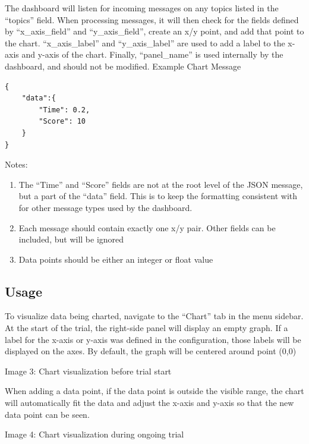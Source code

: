The dashboard will listen for incoming messages on any topics listed in the
``topics” field. When processing messages, it will then check for the fields
defined by ``x\_axis\_field'' and ``y\_axis\_field”, create an x/y point, and
add that point to the chart. ``x\_axis\_label'' and ``y\_axis\_label'' are used to
add a label to the x-axis and y-axis of the chart. Finally, ``panel\_name'' is
used internally by the dashboard, and should not be modified.  Example Chart
Message

\begin{verbatim}
{
    "data":{
        "Time": 0.2,
        "Score": 10
    }
}
\end{verbatim}



Notes:
\begin{enumerate}

    \item The ``Time” and ``Score” fields are not at the root level of the JSON
        message, but a part of the ``data” field. This is to keep the
        formatting consistent with for other message types used by the
        dashboard.

    \item Each message should contain exactly one x/y pair. Other fields can be
        included, but will be ignored

    \item Data points should be either an integer or float value

\end{enumerate}

\subsection{Usage}

To visualize data being charted, navigate to the ``Chart” tab in the menu
sidebar. At the start of the trial, the right-side panel will display an empty
graph. If a label for the x-axis or y-axis was defined in the configuration,
those labels will be displayed on the axes.  By default, the graph will be
centered around point (0,0)

Image 3: Chart visualization before trial start

When adding a data point, if the data point is outside the visible range, the
chart will automatically fit the data and adjust the x-axis and y-axis so that
the new data point can be seen.

Image 4: Chart visualization during ongoing trial
